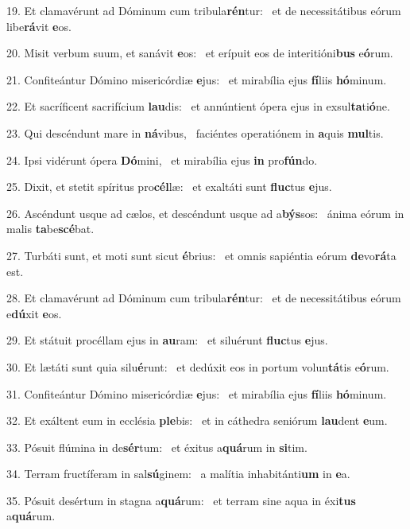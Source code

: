 19. Et clamavérunt ad Dóminum cum tribula\textbf{rén}tur: \ast\  et de necessitátibus eórum libe\textbf{rá}vit \textbf{e}os.\

20. Misit verbum suum, et sanávit \textbf{e}os: \ast\  et erípuit eos de interitióni\textbf{bus} e\textbf{ó}rum.\

21. Confiteántur Dómino misericórdiæ \textbf{e}jus: \ast\  et mirabília ejus \textbf{fí}liis \textbf{hó}minum.\

22. Et sacríficent sacrifícium \textbf{lau}dis: \ast\  et annúntient ópera ejus in exsul\textbf{ta}ti\textbf{ó}ne.\

23. Qui descéndunt mare in \textbf{ná}vibus, \ast\  faciéntes operatiónem in \textbf{a}quis \textbf{mul}tis.\

24. Ipsi vidérunt ópera \textbf{Dó}mini, \ast\  et mirabília ejus \textbf{in} pro\textbf{fún}do.\

25. Dixit, et stetit spíritus pro\textbf{cél}læ: \ast\  et exaltáti sunt \textbf{fluc}tus \textbf{e}jus.\

26. Ascéndunt usque ad cælos, et descéndunt usque ad a\textbf{býs}sos: \ast\  ánima eórum in malis \textbf{ta}be\textbf{scé}bat.\

27. Turbáti sunt, et moti sunt sicut \textbf{é}brius: \ast\  et omnis sapiéntia eórum \textbf{de}vo\textbf{rá}ta est.\

28. Et clamavérunt ad Dóminum cum tribula\textbf{rén}tur: \ast\  et de necessitátibus eórum e\textbf{dú}xit \textbf{e}os.\

29. Et státuit procéllam ejus in \textbf{au}ram: \ast\  et siluérunt \textbf{fluc}tus \textbf{e}jus.\

30. Et lætáti sunt quia silu\textbf{é}runt: \ast\  et dedúxit eos in portum volun\textbf{tá}tis e\textbf{ó}rum.\

31. Confiteántur Dómino misericórdiæ \textbf{e}jus: \ast\  et mirabília ejus \textbf{fí}liis \textbf{hó}minum.\

32. Et exáltent eum in ecclésia \textbf{ple}bis: \ast\  et in cáthedra seniórum \textbf{lau}dent \textbf{e}um.\

33. Pósuit flúmina in de\textbf{sér}tum: \ast\  et éxitus a\textbf{quá}rum in \textbf{si}tim.\

34. Terram fructíferam in sal\textbf{sú}ginem: \ast\  a malítia inhabitánti\textbf{um} in \textbf{e}a.\

35. Pósuit desértum in stagna a\textbf{quá}rum: \ast\  et terram sine aqua in éxi\textbf{tus} a\textbf{quá}rum.\

